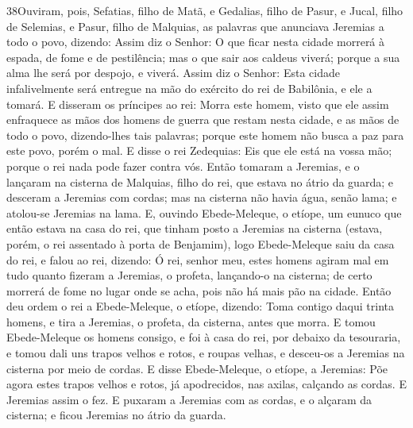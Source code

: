 \medskip

\lettrine{38} Ouviram, pois, Sefatias, filho de Matã, e
Gedalias, filho de Pasur, e Jucal, filho de Selemias, e Pasur, filho
de Malquias, as palavras que anunciava Jeremias a todo o povo,
dizendo: Assim diz o Senhor: O que ficar nesta cidade morrerá à
espada, de fome e de pestilência; mas o que sair aos caldeus viverá;
porque a sua alma lhe será por despojo, e viverá. Assim diz o
Senhor: Esta cidade infalivelmente será entregue na mão do exército
do rei de Babilônia, e ele a tomará. E disseram os príncipes ao
rei: Morra este homem, visto que ele assim enfraquece as mãos dos
homens de guerra que restam nesta cidade, e as mãos de todo o povo,
dizendo-lhes tais palavras; porque este homem não busca a paz para
este povo, porém o mal. E disse o rei Zedequias: Eis que ele
está na vossa mão; porque o rei nada pode fazer contra vós.
Então tomaram a Jeremias, e o lançaram na cisterna de Malquias,
filho do rei, que estava no átrio da guarda; e desceram a Jeremias
com cordas; mas na cisterna não havia água, senão lama; e atolou-se
Jeremias na lama. E, ouvindo Ebede-Meleque, o etíope, um eunuco
que então estava na casa do rei, que tinham posto a Jeremias na
cisterna (estava, porém, o rei assentado à porta de Benjamim),
logo Ebede-Meleque saiu da casa do rei, e falou ao rei, dizendo:
Ó rei, senhor meu, estes homens agiram mal em tudo quanto
fizeram a Jeremias, o profeta, lançando-o na cisterna; de certo
morrerá de fome no lugar onde se acha, pois não há mais pão na
cidade. Então deu ordem o rei a Ebede-Meleque, o etíope,
dizendo: Toma contigo daqui trinta homens, e tira a Jeremias, o
profeta, da cisterna, antes que morra. E tomou Ebede-Meleque
os homens consigo, e foi à casa do rei, por debaixo da tesouraria, e
tomou dali uns trapos velhos e rotos, e roupas velhas, e desceu-os a
Jeremias na cisterna por meio de cordas. E disse
Ebede-Meleque, o etíope, a Jeremias: Põe agora estes trapos velhos e
rotos, já apodrecidos, nas axilas, calçando as cordas. E Jeremias
assim o fez. E puxaram a Jeremias com as cordas, e o alçaram
da cisterna; e ficou Jeremias no átrio da guarda.

